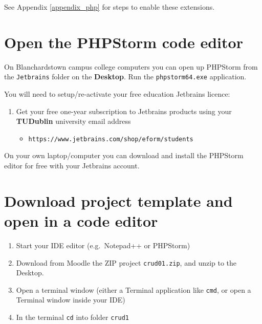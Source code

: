 \documentclass[a4paperpaper,openright]{book}
\providecommand{\tightlist}{%
  \setlength{\itemsep}{0pt}\setlength{\parskip}{0pt}}
\begin{document}
See Appendix \ref{appendix_php} for steps to enable these extensions.

\hypertarget{open-the-phpstorm-code-editor}{%
\section{Open the PHPStorm code
editor}\label{open-the-phpstorm-code-editor}}

On Blanchardstown campus college computers you can open up PHPStorm from
the \texttt{Jetbrains} folder on the \textbf{Desktop}. Run the
\texttt{phpstorm64.exe} application.

You will need to setup/re-activate your free education Jetbrains
licence:

\begin{enumerate}
\def\labelenumi{\arabic{enumi}.}
\item
  Get your free one-year subscription to Jetbrains products using your
  \textbf{TUDublin} university email address

  \begin{itemize}
  \tightlist
  \item
    \texttt{https://www.jetbrains.com/shop/eform/students}
  \end{itemize}
\end{enumerate}

On your own laptop/computer you can download and install the PHPStorm
editor for free with your Jetbrains account.

\hypertarget{download-project-template-and-open-in-a-code-editor}{%
\section{Download project template and open in a code
editor}\label{download-project-template-and-open-in-a-code-editor}}

\begin{enumerate}
\def\labelenumi{\arabic{enumi}.}
\item
  Start your IDE editor (e.g.~Notepad++ or PHPStorm)
\item
  Download from Moodle the ZIP project \texttt{crud01.zip}, and unzip to
  the Desktop.
\item
  Open a terminal window (either a Terminal application like
  \texttt{cmd}, or open a Terminal window inside your IDE)
\item
  In the terminal \texttt{cd} into folder \texttt{crud1}
\end{enumerate}
\end{document}
